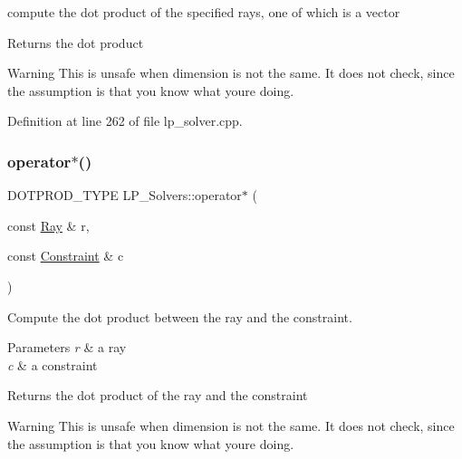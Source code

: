 compute the dot product of the specified rays, one of which is a vector 

\begin{DoxyReturn}{Returns}
the dot product 
\end{DoxyReturn}
\begin{DoxyWarning}{Warning}
This is unsafe when dimension is not the same. It does not check, since the assumption is that you know what you\textquotesingle{}re doing. 
\end{DoxyWarning}


Definition at line 262 of file lp\+\_\+solver.\+cpp.

\mbox{\label{group___c_l_s_solvers_gaea75db1559315f35242d62e9e5f66e92}} 
\subsubsection{\texorpdfstring{operator$\ast$()}{operator*()}\hspace{0.1cm}{\footnotesize\ttfamily [5/6]}}
{\footnotesize\ttfamily D\+O\+T\+P\+R\+O\+D\+\_\+\+T\+Y\+PE L\+P\+\_\+\+Solvers\+::operator$\ast$ (\begin{DoxyParamCaption}\item[{const \hyperlink{group___c_l_s_solvers_class_l_p___solvers_1_1_ray}{Ray} \&}]{r,  }\item[{const \hyperlink{group___c_l_s_solvers_class_l_p___solvers_1_1_constraint}{Constraint} \&}]{c }\end{DoxyParamCaption})\hspace{0.3cm}{\ttfamily [inline]}}



Compute the dot product between the ray and the constraint. 


\begin{DoxyParams}{Parameters}
{\em r} & a ray \\
\hline
{\em c} & a constraint \\
\hline
\end{DoxyParams}
\begin{DoxyReturn}{Returns}
the dot product of the ray and the constraint 
\end{DoxyReturn}
\begin{DoxyWarning}{Warning}
This is unsafe when dimension is not the same. It does not check, since the assumption is that you know what you\textquotesingle{}re doing. 
\end{DoxyWarning}


